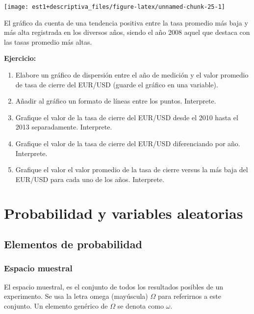 \documentclass[
]{book}
\providecommand{\tightlist}{%
  \setlength{\itemsep}{0pt}\setlength{\parskip}{0pt}}
\begin{document}
\begin{center}\texttt{[image: est1+descriptiva\_files/figure-latex/unnamed-chunk-25-1]} \end{center}

El gráfico da cuenta de una tendencia positiva entre la tasa promedio más baja y más alta registrada en los diversos años, siendo el año 2008 aquel que destaca con las tasas promedio más altas.

\textbf{Ejercicio:}

\begin{enumerate}
\def\labelenumi{\arabic{enumi}.}
\tightlist
\item
  Elabore un gráfico de dispersión entre el año de medición y el valor promedio de tasa de cierre del EUR/USD (guarde el gráfico en una variable).
\item
  Añadir al gráfico un formato de líneas entre los puntos. Interprete.
\item
  Grafique el valor de la tasa de cierre del EUR/USD desde el 2010 hasta el 2013 separadamente. Interprete.
\item
  Grafique el valor de la tasa de cierre del EUR/USD diferenciando por año. Interprete.
\item
  Grafique el valor el valor promedio de la tasa de cierre versus la más baja del EUR/USD para cada uno de los años. Interprete.
\end{enumerate}

\hypertarget{probabilidad-y-variables-aleatorias}{%
\chapter{Probabilidad y variables aleatorias}\label{probabilidad-y-variables-aleatorias}}

\hypertarget{elementos-de-probabilidad}{%
\section{Elementos de probabilidad}\label{elementos-de-probabilidad}}

\hypertarget{espacio-muestral}{%
\subsection{Espacio muestral}\label{espacio-muestral}}

El espacio muestral, es el conjunto de todos los resultados posibles de un experimento. Se usa la letra omega (mayúscula) \(\Omega\) para referirnos a este conjunto. Un elemento genérico de \(\Omega\) se denota como \(\omega\).
\end{document}
